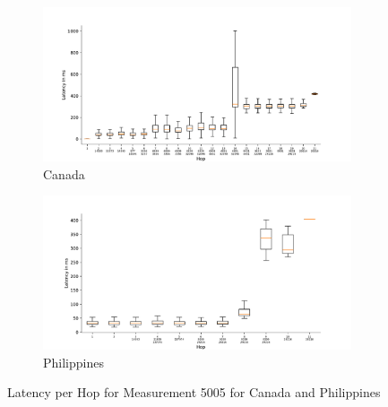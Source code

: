 \begin{figure}
	\centering
	\begin{subfigure}[b]{\linewidth}
		\includegraphics[width=\linewidth]{chapters/4-results/traceroute/img/latency-per-hop-CA-5005.pdf}
		\caption{Canada}
	\end{subfigure}
	\begin{subfigure}[b]{\linewidth}
		\includegraphics[width=\linewidth]{chapters/4-results/traceroute/img/latency-per-hop-PH-5005.pdf}
		\caption{Philippines}
	\end{subfigure}
	\caption{Latency per Hop for Measurement 5005 for Canada and
		Philippines}
	\label{fig:latency-change-per-hop-appendix-3}
\end{figure}

